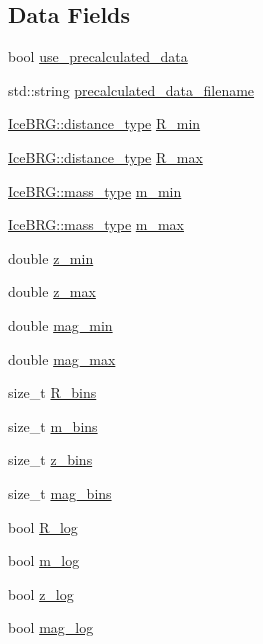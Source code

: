 \subsection*{Data Fields}
\begin{DoxyCompactItemize}
\item 
bool \hyperlink{structgg__lensing__config_a3fe4ca186ed399f741d499e1e0e4acf8}{use\-\_\-precalculated\-\_\-data}
\item 
std\-::string \hyperlink{structgg__lensing__config_a8bc252029c599446dfbba897920eca0f}{precalculated\-\_\-data\-\_\-filename}
\item 
\hyperlink{namespaceIceBRG_a45499647eb87e24c10ab32c628711cec}{Ice\-B\-R\-G\-::distance\-\_\-type} \hyperlink{structgg__lensing__config_a14445ac28a5b6e168d407b5a862fa186}{R\-\_\-min}
\item 
\hyperlink{namespaceIceBRG_a45499647eb87e24c10ab32c628711cec}{Ice\-B\-R\-G\-::distance\-\_\-type} \hyperlink{structgg__lensing__config_a18e40e60fa8b0f06e7550eb3c0411a8b}{R\-\_\-max}
\item 
\hyperlink{namespaceIceBRG_a1be72ac4918a9b029f2eefa084213e35}{Ice\-B\-R\-G\-::mass\-\_\-type} \hyperlink{structgg__lensing__config_af80680456a55ac0efca1fa309d1611f2}{m\-\_\-min}
\item 
\hyperlink{namespaceIceBRG_a1be72ac4918a9b029f2eefa084213e35}{Ice\-B\-R\-G\-::mass\-\_\-type} \hyperlink{structgg__lensing__config_a0b33d2e197f1972c8164567295f83f87}{m\-\_\-max}
\item 
double \hyperlink{structgg__lensing__config_a983f7b673fc379bfcc96e69820057f8e}{z\-\_\-min}
\item 
double \hyperlink{structgg__lensing__config_a16239d6e2c8ad5c3850abf9a47096701}{z\-\_\-max}
\item 
double \hyperlink{structgg__lensing__config_a51c75e4b7d5da1bb3dff5979131259c9}{mag\-\_\-min}
\item 
double \hyperlink{structgg__lensing__config_a3f234006efbd74be8b82a79ca4bda522}{mag\-\_\-max}
\item 
size\-\_\-t \hyperlink{structgg__lensing__config_a0222122d7470e67e7aeb52096fcb6f90}{R\-\_\-bins}
\item 
size\-\_\-t \hyperlink{structgg__lensing__config_a80fc5e7efdd390f1d3d96898471802cc}{m\-\_\-bins}
\item 
size\-\_\-t \hyperlink{structgg__lensing__config_aff53350063b74ef73c8cea9b89a8780e}{z\-\_\-bins}
\item 
size\-\_\-t \hyperlink{structgg__lensing__config_a3c82853304ede01b0697d0c05d0db1d0}{mag\-\_\-bins}
\item 
bool \hyperlink{structgg__lensing__config_a4ca415b5664d589eadea71166aaba4bc}{R\-\_\-log}
\item 
bool \hyperlink{structgg__lensing__config_ad92bfc552d828962e8a5525999ae0a6b}{m\-\_\-log}
\item 
bool \hyperlink{structgg__lensing__config_a454b771c419a63d1512bbd220257b095}{z\-\_\-log}
\item 
bool \hyperlink{structgg__lensing__config_aefcae2d2981313e2c3ef4f9e378d9976}{mag\-\_\-log}
\end{DoxyCompactItemize}
